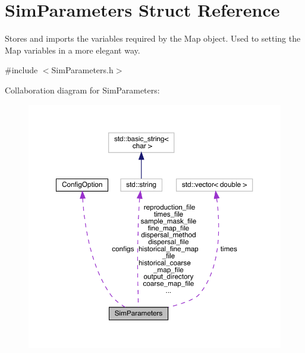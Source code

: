 \hypertarget{struct_sim_parameters}{}\section{Sim\+Parameters Struct Reference}
\label{struct_sim_parameters}


Stores and imports the variables required by the Map object. Used to setting the Map variables in a more elegant way.  




{\ttfamily \#include $<$Sim\+Parameters.\+h$>$}



Collaboration diagram for Sim\+Parameters\+:\nopagebreak
\begin{figure}[H]
\begin{center}
\leavevmode
\includegraphics[width=350pt]{struct_sim_parameters__coll__graph}
\end{center}
\end{figure}
